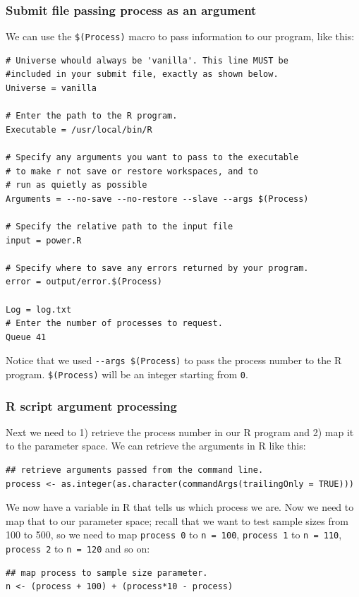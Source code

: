 \documentclass[11pt]{article}
\begin{document}
\subsubsection{Submit file passing process as an argument}
\label{sec-7-4-1}
We can use the \texttt{\$(Process)} macro to pass information to our program, like this:
\begin{verbatim}
# Universe whould always be 'vanilla'. This line MUST be 
#included in your submit file, exactly as shown below.
Universe = vanilla

# Enter the path to the R program.
Executable = /usr/local/bin/R

# Specify any arguments you want to pass to the executable
# to make r not save or restore workspaces, and to 
# run as quietly as possible
Arguments = --no-save --no-restore --slave --args $(Process)

# Specify the relative path to the input file
input = power.R

# Specify where to save any errors returned by your program.
error = output/error.$(Process)

Log = log.txt
# Enter the number of processes to request.
Queue 41
\end{verbatim}
Notice that we used \texttt{-{}-args \$(Process)} to pass the process number to the R program. \texttt{\$(Process)} will be an integer starting from \texttt{0}. 

\subsubsection{R script argument processing}
\label{sec-7-4-2}
Next we need to 1) retrieve the process number in our R program and 2) map it to the parameter space. We can retrieve the arguments in R like this:
\begin{verbatim}
## retrieve arguments passed from the command line.
process <- as.integer(as.character(commandArgs(trailingOnly = TRUE)))
\end{verbatim}
We now have a variable in R that tells us which process we are. Now we need to map that to our parameter space; recall that we want to test sample sizes from 100 to 500, so we need to map \texttt{process 0} to \texttt{n = 100},  \texttt{process 1} to \texttt{n = 110}, \texttt{process 2} to \texttt{n = 120} and so on:
\begin{verbatim}
## map process to sample size parameter.
n <- (process + 100) + (process*10 - process)
\end{verbatim}
\end{document}
